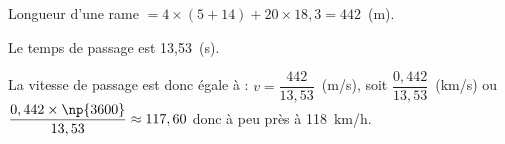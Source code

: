 
\medskip

%
%
%
%
%
%
%
%
%
%
%
% 
% 
Longueur d'une rame $= 4 \times (5 + 14) + 20 \times 18,3 = 442$~(m).

Le temps de passage est 13,53~(s).

La vitesse de passage est donc égale à : $v = \dfrac{442}{13,53}$~(m/s), soit $\dfrac{0,442}{13,53}$~(km/s) ou $\dfrac{0,442 \times \np{3600}}{13,53} \approx 117,60$ donc à peu près à 118~km/h.

\bigskip

